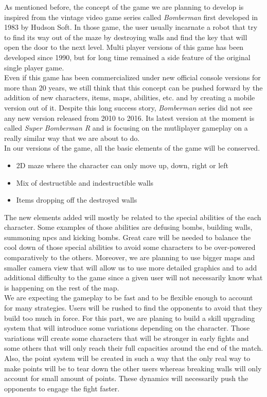 
As mentioned before, the concept of the game we are planning to develop is inspired from the vintage video game series called \textit{Bomberman} first developed in 1983 by Hudson Soft. In those game, the user usually incarnate a robot that try to find its way out of the maze by destroying walls and find the key that will open the door to the next level. Multi player versions of this game has been developed since 1990, but for long time remained a side feature of the original single player game. \cite{wiki:bomberman} \\

Even if this game has been commercialized under new official console versions for more than 20 years, we still think that this concept can be pushed forward by the addition of new characters, items, maps, abilities, etc. and by creating a mobile version out of it. Despite this long success story, \textit{Bomberman} series did not see any new version released from 2010 to 2016. Its latest version at the moment is called \textit{Super Bomberman R} and is focusing on the mutliplayer gameplay on a really similar way that we are about to do. \\

In our versions of the game, all the basic elements of the game will be conserved.
\begin{itemize}
  \item 2D maze where the character can only move up, down, right or left
  \item Mix of destructible and indestructible walls
  \item Items dropping off the destroyed walls
\end{itemize}
The new elements added will mostly be related to the special abilities of the each character. Some examples of those abilities are defusing bombs, building walls, summoning \glspl{npc} and kicking bombs. Great care will be needed to balance the cool down of those special abilities to avoid some characters to be over-powered comparatively to the others. Moreover, we are planning to use bigger maps and smaller camera view that will allow us to use more detailed graphics and to add additional difficulty to the game since a given user will not necessarily know what is happening on the rest of the map. \\

We are expecting the gameplay to be fast and to be flexible enough to account for many strategies. Users will be rushed to find the opponents to avoid that they build too much in force. For this part, we are planing to build a skill upgrading system that will introduce some variations depending on the character. Those variations will create some characters that will be stronger in early fights and some others that will only reach their full capacities around the end of the match. Also, the point system will be created in such a way that the only real way to make points will be to tear down the other users whereas breaking walls will only account for small amount of points. These dynamics will necessarily push the opponents to engage the fight faster. \\

